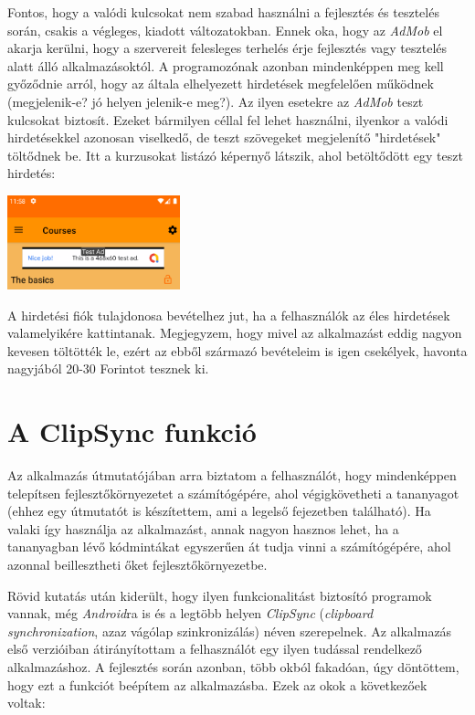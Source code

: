 \documentclass[12pt,a4paper]{article}
\begin{document}
	Fontos, hogy a valódi kulcsokat nem szabad használni a fejlesztés és tesztelés során, csakis a végleges, kiadott változatokban. Ennek oka, hogy az \textit{AdMob} el akarja kerülni, hogy a szervereit felesleges terhelés érje fejlesztés vagy tesztelés alatt álló alkalmazásoktól. A programozónak azonban mindenképpen meg kell győződnie arról, hogy az általa elhelyezett hirdetések megfelelően működnek (megjelenik-e? jó helyen jelenik-e meg?). Az ilyen esetekre az \textit{AdMob} teszt kulcsokat biztosít. Ezeket bármilyen céllal fel lehet használni, ilyenkor a valódi hirdetésekkel azonosan viselkedő, de teszt szövegeket megjelenítő "hirdetések" töltődnek be. Itt a kurzusokat listázó képernyő látszik, ahol betöltődött egy teszt hirdetés:  
	
	\begin{center}
		\includegraphics[width=5cm]{test_ad}
	\end{center}

	A hirdetési fiók tulajdonosa bevételhez jut, ha a felhasználók az éles hirdetések valamelyikére kattintanak. Megjegyzem, hogy mivel az alkalmazást eddig nagyon kevesen töltötték le, ezért az ebből származó bevételeim is igen csekélyek, havonta nagyjából 20-30 Forintot tesznek ki.

	\section{A ClipSync funkció}\label{clipsync}
	
	Az alkalmazás útmutatójában arra biztatom a felhasználót, hogy mindenképpen telepítsen fejlesztőkörnyezetet a számítógépére, ahol végigkövetheti a tananyagot (ehhez egy útmutatót is készítettem, ami a legelső fejezetben található). Ha valaki így használja az alkalmazást, annak nagyon hasznos lehet, ha a tananyagban lévő kódmintákat egyszerűen át tudja vinni a számítógépére, ahol azonnal beillesztheti őket fejlesztőkörnyezetbe.
	
	Rövid kutatás után kiderült, hogy ilyen funkcionalitást biztosító programok vannak, még \textit{Android}ra is és a legtöbb helyen \textit{ClipSync} (\textit{clipboard synchronization}, azaz vágólap szinkronizálás) néven szerepelnek. Az alkalmazás első verzióiban átirányítottam a 
	felhasználót egy ilyen tudással rendelkező alkalmazáshoz. A fejlesztés során azonban, több okból fakadóan, úgy döntöttem, hogy ezt a funkciót beépítem az alkalmazásba. Ezek az okok a következőek voltak:
	
\end{document}
